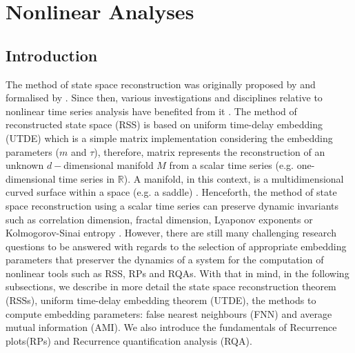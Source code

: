 \chapter{Nonlinear Analyses} \label{chapter3}

%
\graphicspath{{figs/chapter3/PDF/}}


\section{Introduction}
The method of state space reconstruction was originally proposed by 
\cite{packard1980} and formalised by \cite{takens1981}. Since then, various 
investigations and disciplines relative to nonlinear time series analysis 
have benefited from it \citep{aguirre2009, stergiou2011, frank2010, sama2013}.
The method of reconstructed state space (RSS) is based on uniform time-delay 
embedding (UTDE) which is a simple matrix implementation considering the 
embedding 
parameters ($m$ and $\tau$), therefore, matrix represents the reconstruction
of an unknown $d-$dimensional manifold $M$ from a scalar 
time series (e.g. one-dimensional time series in $\mathbb{R}$).
A manifold, in this context, is a multidimensional curved surface within a 
space (e.g. a saddle) \citep{guastello-gregson2011}.
Henceforth, the method of state space reconstruction using a scalar time series 
can preserve dynamic invariants such as correlation dimension, 
fractal dimension, Lyaponov exponents or Kolmogorov-Sinai entropy 
\citep{bradley2015, Quintana-Duque2012, 
Quintana-Duque2013, Quintana-Duque2016, krakovska2015}.
However, 
there are still many challenging research questions to be answered  
with regards to the selection of appropriate embedding parameters 
that preserver the dynamics of a system 
for the computation of nonlinear tools such as RSS, RPs and RQAs.
With that in mind, in the following subsections, we describe in more 
detail the state space 
reconstruction theorem (RSSs), uniform time-delay embedding theorem (UTDE),
the methods to compute embedding parameters: false nearest neighbours (FNN)
and average mutual information (AMI).
We also introduce the fundamentals of Recurrence plots(RPs) and 
Recurrence quantification analysis (RQA).

